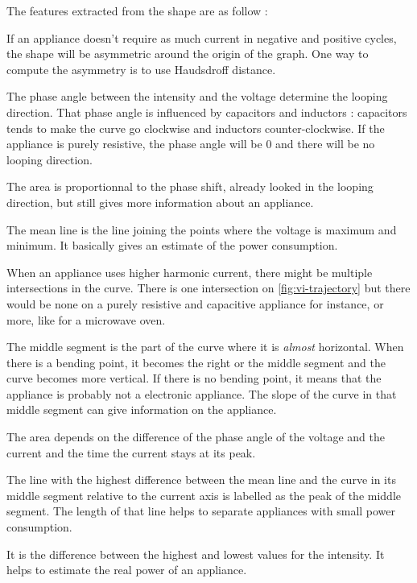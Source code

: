 The features extracted from the shape are as follow \cite{lam2007novel}:
\begin{description}[align=left]
\item[Asymmetry] If an appliance doesn't require as much current in negative and positive cycles, the shape will be asymmetric around the origin of the graph. One way to compute the asymmetry is to use Haudsdroff distance.
\item[Looping direction] The phase angle between the intensity and the voltage determine the looping direction. That phase angle is influenced by capacitors and inductors : capacitors tends to make the curve go clockwise and inductors counter-clockwise. If the appliance is purely resistive, the phase angle will be 0 and there will be no looping direction.
\item[Area] The area is proportionnal to the phase shift, already looked in the looping direction, but still gives more information about an appliance.
\item[Slope of mean line] The mean line is the line joining the points where the voltage is maximum and minimum. It basically gives an estimate of the power consumption.
\item[Self-intersection] When an appliance uses higher harmonic current, there might be multiple intersections in the curve. There is one intersection on \autoref{fig:vi-trajectory} but there would be none on a purely resistive and capacitive appliance for instance, or more, like for a microwave oven. 
\item[Slope of middle segment] The middle segment is the part of the curve where it is \textit{almost} horizontal. When there is a bending point, it becomes the right or the middle segment and the curve becomes more vertical. If there is no bending point, it means that the appliance is probably not a electronic appliance. The slope of the curve in that middle segment can give information on the appliance.
\item[Area of left and right segments] The area depends on the difference of the phase angle of the voltage and the current and the time the current stays at its peak.
\item[Peak of middle segment] The line with the highest difference between the mean line and the curve in its middle segment relative to the current axis is labelled as the peak of the middle segment. The length of that line helps to separate appliances with small power consumption.
\item[Span] It is the difference between the highest and lowest values for the intensity. It helps to estimate the real power of an appliance.
\end{description}

